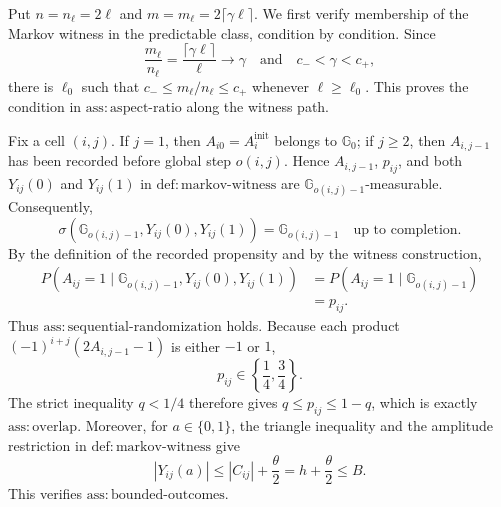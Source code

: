 Put \(n=n_\ell=2\ell\) and \(m=m_\ell=2\lceil\gamma\ell\rceil\).  We first verify membership of the Markov witness in the predictable class, condition by condition.  Since
\[
 \frac{m_\ell}{n_\ell}=\frac{\lceil\gamma\ell\rceil}{\ell}\longrightarrow\gamma
 \quad\text{and}\quad c_-<\gamma<c_+,
\]
there is \(\ell_0\) such that \(c_-\le m_\ell/n_\ell\le c_+\) whenever \(\ell\ge\ell_0\).  This proves the condition in \(\mathrm{ass:aspect\mbox{-}ratio}\) along the witness path.

Fix a cell \((i,j)\).  If \(j=1\), then \(A_{i0}=A_i^{\mathrm{init}}\) belongs to \(\mathbb G_0\); if \(j\ge2\), then \(A_{i,j-1}\) has been recorded before global step \(o(i,j)\).  Hence \(A_{i,j-1}\), \(p_{ij}\), and both \(Y_{ij}(0)\) and \(Y_{ij}(1)\) in \(\mathrm{def:markov\mbox{-}witness}\) are \(\mathbb G_{o(i,j)-1}\)-measurable.  Consequently,
\[
 \sigma\!\left(\mathbb G_{o(i,j)-1},Y_{ij}(0),Y_{ij}(1)\right)
 =\mathbb G_{o(i,j)-1}
 \quad\text{up to completion}.
\]
By the definition of the recorded propensity and by the witness construction,
\[
 \begin{aligned}
 P\!\left(A_{ij}=1\mid\mathbb G_{o(i,j)-1},Y_{ij}(0),Y_{ij}(1)\right)
 &=P\!\left(A_{ij}=1\mid\mathbb G_{o(i,j)-1}\right)\\
 &=p_{ij}.
 \end{aligned}
\]
Thus \(\mathrm{ass:sequential\mbox{-}randomization}\) holds.  Because each product \((-1)^{i+j}(2A_{i,j-1}-1)\) is either \(-1\) or \(1\),
\[
 p_{ij}\in\left\{\frac14,\frac34\right\}.
\]
The strict inequality \(q<1/4\) therefore gives \(q\le p_{ij}\le1-q\), which is exactly \(\mathrm{ass:overlap}\).  Moreover, for \(a\in\{0,1\}\), the triangle inequality and the amplitude restriction in \(\mathrm{def:markov\mbox{-}witness}\) give
\[
 |Y_{ij}(a)|\le |C_{ij}|+\frac{\theta}{2}
 =h+\frac{\theta}{2}\le B.
\]
This verifies \(\mathrm{ass:bounded\mbox{-}outcomes}\).

